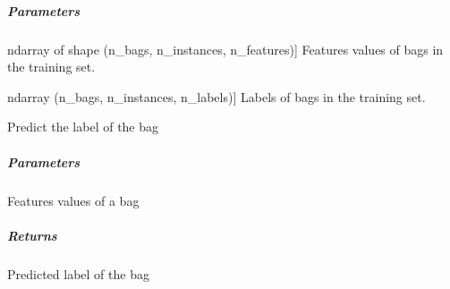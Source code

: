 \documentclass[letterpaper,10pt,english]{sphinxmanual}
\begin{document}
\begin{fulllineitems}
\begin{fulllineitems}
\subparagraph{Parameters}
\label{\detokenize{classifier/mi/_autosummary/miml.classifier.mi.apr_classifier.APRClassifier:parameters}}\begin{description}
\sphinxlineitem{x\_train}{[}ndarray of shape (n\_bags, n\_instances, n\_features){]}
\sphinxAtStartPar
Features values of bags in the training set.

\sphinxlineitem{y\_train}{[}ndarray (n\_bags, n\_instances, n\_labels){]}
\sphinxAtStartPar
Labels of bags in the training set.

\end{description}

\end{fulllineitems}


\begin{fulllineitems}
\label{\detokenize{classifier/mi/_autosummary/miml.classifier.mi.apr_classifier.APRClassifier:miml.classifier.mi.apr_classifier.APRClassifier.predict}}
\pysigstartsignatures
{}
\pysigstopsignatures
\sphinxAtStartPar
Predict the label of the bag


\subparagraph{Parameters}
\label{\detokenize{classifier/mi/_autosummary/miml.classifier.mi.apr_classifier.APRClassifier:id1}}\begin{description}
\sphinxAtStartPar
Features values of a bag

\end{description}


\subparagraph{Returns}
\label{\detokenize{classifier/mi/_autosummary/miml.classifier.mi.apr_classifier.APRClassifier:returns}}\begin{description}
\sphinxAtStartPar
Predicted label of the bag

\end{description}

\end{fulllineitems}



\end{fulllineitems}
\end{document}
